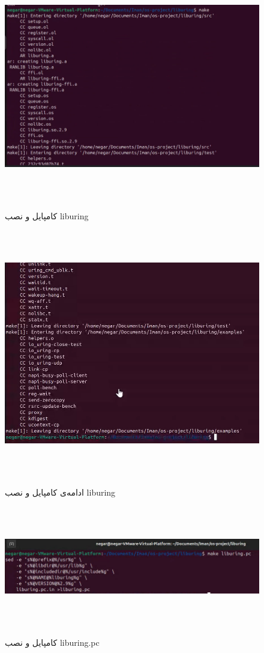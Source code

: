 ‫
‫‫‫\begin{figure}[H]
‫	‫	‫	‫	‫    \centering
‫	‫	‫	‫	‫    \includegraphics[width=\textwidth]{figs/23.jpg}
‫	‫			\caption{کامپایل و نصب liburing}
‫‫\end{figure}
‫
‫‫‫\begin{figure}[H]
‫	‫	‫	‫	‫    \centering
‫	‫	‫	‫	‫    \includegraphics[width=\textwidth]{figs/24.jpg}
‫	‫			\caption{ادامه‌ی کامپایل و نصب liburing}
‫‫\end{figure}
‫
‫
‫‫‫\begin{figure}[H]
‫	‫	‫	‫	‫	‫    \centering
‫	‫	‫	‫	‫	‫    \includegraphics[width=\textwidth]{figs/25.jpg}
‫	‫	‫			\caption{کامپایل و نصب liburing.pc}
‫‫\end{figure}
